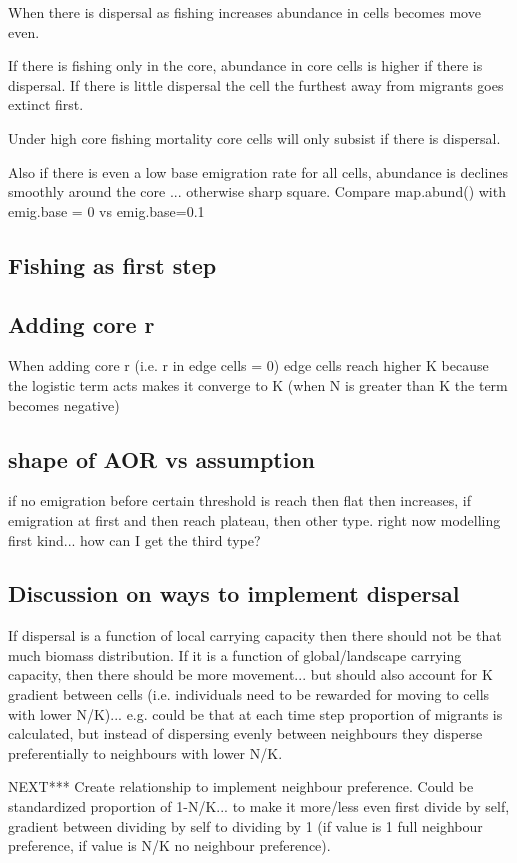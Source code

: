 \documentclass{article}
\begin{document}
When there is dispersal as fishing increases abundance in cells
becomes move even.

If there is fishing only in the core, abundance in core cells is
higher if there is dispersal.
If there is little dispersal the cell the furthest away from migrants
goes extinct first.

Under high core fishing mortality core cells will only subsist if
there is dispersal.

Also if there is even a low base emigration rate for all cells,
abundance is declines smoothly around the core ... otherwise sharp
square. Compare map.abund() with emig.base = 0 vs emig.base=0.1
\subsection{Fishing as first step}
\subsection{Adding core r}
When adding core r (i.e. r in edge cells = 0) edge cells reach higher
K because the logistic term acts makes it converge to K (when N is
greater than K the term becomes negative)

\subsection{shape of AOR vs assumption}
if no emigration before certain threshold is reach then flat then
increases, if emigration at first and then reach plateau, then other
type. right now modelling first kind... how can I get the third type?

\subsection{Discussion on ways to implement dispersal}
If dispersal is a function of local carrying capacity then there
should not be that much biomass distribution. If it is a function of
global/landscape carrying capacity, then there should be more
movement... but should also account for K gradient between cells
(i.e. individuals need to be rewarded for moving to cells with lower
N/K)... e.g. could be that at each time step proportion of migrants is
calculated, but instead of dispersing evenly between neighbours they
disperse preferentially to neighbours with lower N/K.

NEXT*** Create relationship to implement neighbour preference. Could be
standardized proportion of 1-N/K... to make it more/less even first
divide by self, gradient between dividing by self to dividing by 1 (if
value is 1 full neighbour preference, if value is N/K no neighbour
preference).
\end{document}
